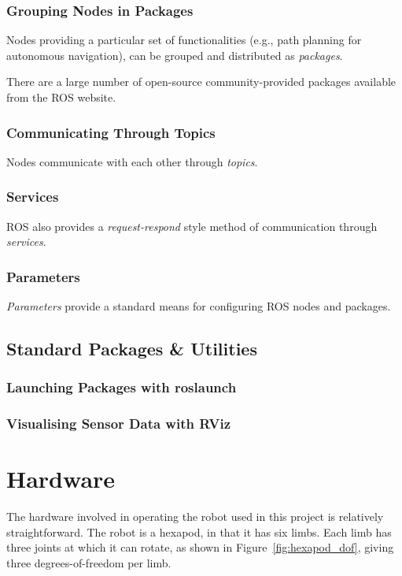 \documentclass{l4proj}
\begin{document}
\subsubsection{Grouping Nodes in Packages}
Nodes providing a particular set of functionalities (e.g., path planning for autonomous navigation), can be grouped and distributed as \emph{packages}.

There are a large number of open-source community-provided packages available from the ROS website.

\subsubsection{Communicating Through Topics}
Nodes communicate with each other through \emph{topics}.

\subsubsection{Services}
ROS also provides a \emph{request-respond} style method of communication through \emph{services}.

\subsubsection{Parameters}
\emph{Parameters} provide a standard means for configuring ROS nodes and packages.

\subsection{Standard Packages \& Utilities}
\subsubsection{Launching Packages with roslaunch}
\subsubsection{Visualising Sensor Data with RViz}


\section{Hardware}
The hardware involved in operating the robot used in this project is relatively straightforward. The robot is a hexapod, in that it has six limbs. Each limb has three joints at which it can rotate, as shown in Figure~\ref{fig:hexapod_dof}, giving three degrees-of-freedom per limb. 
\end{document}
